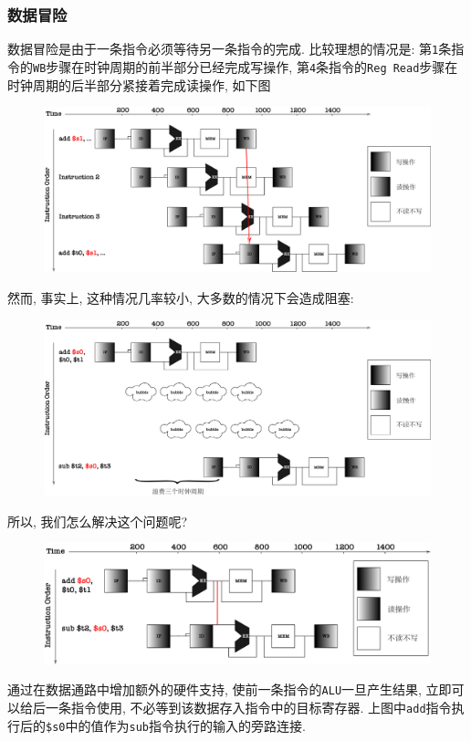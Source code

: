 \subsubsection{数据冒险}
数据冒险是由于一条指令必须等待另一条指令的完成. 比较理想的情况是: 第\verb|1|条指令的\verb|WB|步骤在时钟周期的前半部分已经完成写操作, 第\verb|4|条指令的\verb|Reg Read|步骤在时钟周期的后半部分紧接着完成读操作, 如下图
\begin{figure}[H]
\centering
\includegraphics[scale=.4]{img/figure41.pdf}
\end{figure}
然而, 事实上, 这种情况几率较小, 大多数的情况下会造成阻塞:
\begin{figure}[H]
\centering
\includegraphics[scale=.4]{img/figure42.pdf}
\end{figure}
所以, 我们怎么解决这个问题呢?
\begin{figure}[H]
\centering
\includegraphics[scale=.4]{img/figure43.pdf}
\end{figure}
通过在数据通路中增加额外的硬件支持, 使前一条指令的\verb|ALU|一旦产生结果, 立即可以给后一条指令使用, 不必等到该数据存入指令中的目标寄存器. 上图中\verb|add|指令执行后的\verb|$s0|中的值作为\verb|sub|指令执行的输入的旁路连接.














